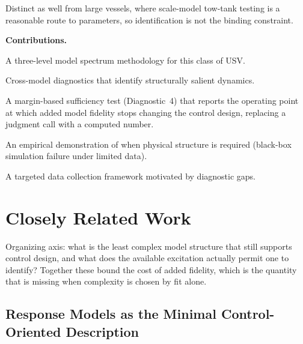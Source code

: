 \documentclass[11pt]{article}
\begin{document}
\begin{outline}
\begin{outline}
  \item Distinct as well from large vessels, where scale-model tow-tank testing is a
    reasonable route to parameters, so identification is not the binding constraint.
  \end{outline}
\item \textbf{Contributions.}
  \begin{outline}
  \item A three-level model spectrum methodology for this class of USV.
  \item Cross-model diagnostics that identify structurally salient dynamics.
  \item A margin-based sufficiency test (Diagnostic~4) that reports the operating
    point at which added model fidelity stops changing the control design, replacing
    a judgment call with a computed number.
  \item An empirical demonstration of when physical structure is required (black-box
    simulation failure under limited data).
  \item A targeted data collection framework motivated by diagnostic gaps.
  \end{outline}
\end{outline}

\section{Closely Related Work}
\label{sec:related}

Organizing axis: what is the least complex model structure that still supports
control design, and what does the available excitation actually permit one to
identify? Together these bound the cost of added fidelity, which is the quantity
that is missing when complexity is chosen by fit alone.

\subsection{Response Models as the Minimal Control-Oriented Description}
\label{sec:rw-response}
\end{document}
